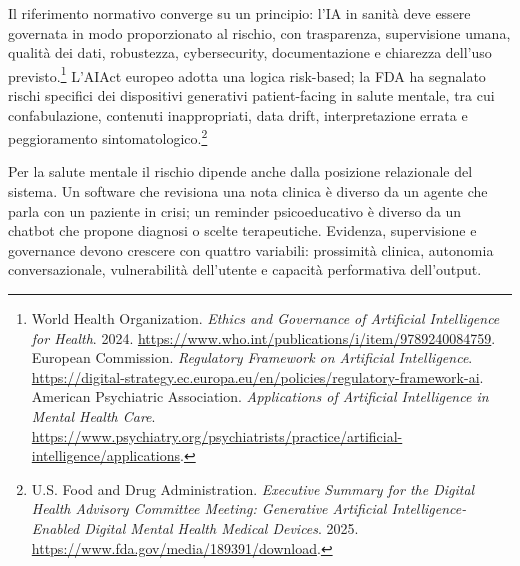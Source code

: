 \documentclass[utf8]{FrontiersinHarvard}
\begin{document}
Il riferimento normativo converge su un principio: l'\ac{IA} in sanit\`a deve essere governata in modo proporzionato al rischio, con trasparenza, supervisione umana, qualit\`a dei dati, robustezza, cybersecurity, documentazione e chiarezza dell'uso previsto.\footnote{World Health Organization. \emph{Ethics and Governance of Artificial Intelligence for Health}. 2024. \url{https://www.who.int/publications/i/item/9789240084759}. European Commission. \emph{Regulatory Framework on Artificial Intelligence}. \url{https://digital-strategy.ec.europa.eu/en/policies/regulatory-framework-ai}. American Psychiatric Association. \emph{Applications of Artificial Intelligence in Mental Health Care}. \url{https://www.psychiatry.org/psychiatrists/practice/artificial-intelligence/applications}.} L'\acs{AIAct} europeo adotta una logica risk-based; la \ac{FDA} ha segnalato rischi specifici dei dispositivi generativi patient-facing in salute mentale, tra cui confabulazione, contenuti inappropriati, data drift, interpretazione errata e peggioramento sintomatologico.\footnote{U.S. Food and Drug Administration. \emph{Executive Summary for the Digital Health Advisory Committee Meeting: Generative Artificial Intelligence-Enabled Digital Mental Health Medical Devices}. 2025. \url{https://www.fda.gov/media/189391/download}.}

Per la salute mentale il rischio dipende anche dalla posizione relazionale del sistema. Un software che revisiona una nota clinica \`e diverso da un agente che parla con un paziente in crisi; un reminder psicoeducativo \`e diverso da un chatbot che propone diagnosi o scelte terapeutiche. Evidenza, supervisione e governance devono crescere con quattro variabili: prossimit\`a clinica, autonomia conversazionale, vulnerabilit\`a dell'utente e capacit\`a performativa dell'output.
\end{document}
